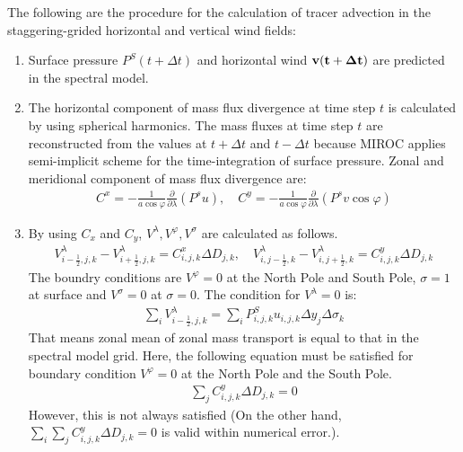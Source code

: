 The following are the procedure for the calculation of tracer advection in the staggering-grided horizontal and vertical wind fields:

\begin{enumerate}
\def\labelenumi{\arabic{enumi}.}
\item
  Surface pressure \(P^{S}(t+\Delta t)\) and horizontal wind \(\bf{v}(t+\Delta t)\) are predicted in the spectral model.
\item
  The horizontal component of mass flux divergence at time step \(t\) is calculated by using spherical harmonics. The mass fluxes at time step \(t\) are reconstructed from the values at \(t+\Delta t\)
  and \(t-\Delta t\) because MIROC applies semi-implicit scheme for the time-integration of surface pressure. Zonal and meridional component of mass flux divergence are:
  \begin{eqnarray}C^{x}=-\frac{1}{a \cos \varphi}\frac{\partial}{\partial \lambda}(P^{s}u),\quad C^{y}=-\frac{1}{a \cos \varphi}\frac{\partial}{\partial \lambda}(P^{s}v \cos \varphi)\end{eqnarray}
\item
  By using \(C_{x}\) and \(C_{y}\), \(V^{\lambda}, V^{\varphi}, V^{\sigma}\) are calculated as follows.
  \begin{eqnarray}V^{\lambda}_{i-\frac{1}{2},j,k}-V^{\lambda}_{i+\frac{1}{2},j,k}=C^{x}_{i,j,k}\Delta D_{j,k}, \quad V^{\lambda}_{i,j-\frac{1}{2},k}-V^{\lambda}_{i,j+\frac{1}{2},k}=C^{y}_{i,j,k}\Delta D_{j,k}\end{eqnarray} The
  boundry conditions are \(V^{\varphi}=0\) at the North Pole and South Pole, \(\sigma=1\) at surface and \(V^{\sigma}=0\) at \(\sigma=0\). The condition for \(V^{\lambda}=0\) is:
  \begin{eqnarray}\sum_{i}V^{\lambda}_{i-\frac{1}{2},j,k}=\sum_{i}P^{S}_{i,j,k}u_{i,j,k}\Delta y_{j}\Delta \sigma_{k}\end{eqnarray} That means zonal mean of zonal mass transport is equal to that in the spectral model grid.
  Here, the following equation must be satisfied for boundary condition \(V^{\varphi}=0\) at the North Pole and the South Pole. \begin{eqnarray}\sum_{j}C^{y}_{i,j,k}\Delta D_{j,k}=0\end{eqnarray} However, this is not always
  satisfied (On the other hand, \(\sum_{i} \sum_{j}C^{y}_{i,j,k}\Delta D_{j,k}=0\) is valid within numerical error.).


\end{enumerate}
